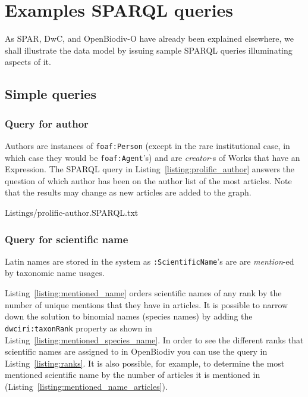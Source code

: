 \section{Examples SPARQL queries}

As SPAR, DwC, and OpenBiodiv-O have already been explained elsewhere, we shall illustrate the data model by issuing sample SPARQL queries illuminating aspects of it.

\subsection{Simple queries}

\subsubsection{Query for author} Authors are instances of {\tt foaf:Person} (except in the rare institutional case, in which case they would be {\tt foaf:Agent}'s) and are \emph{creator}-s of Works that have an Expression. The SPARQL query in Listing~\ref{listing:prolific_author} answers the question of which author has been on the author list of the most articles. Note that the results may change as new articles are added to the graph.


{Listings/prolific-author.SPARQL.txt}

\subsubsection{Query for scientific name}

Latin names are stored in the system as {\tt :ScientificName}'s are are \emph{mention}-ed by taxonomic name usages.

Listing~\ref{listing:mentioned_name} orders scientific names of any rank by the number of unique mentions that they have in articles. It is possible to narrow down the solution to binomial names (species names) by adding the {\tt dwciri:taxonRank} property as shown in Listing~\ref{listing:mentioned_species_name}. In order to see the different ranks that scientific names are assigned to in OpenBiodiv you can use the query in Listing~\ref{listing:ranks}. It is also possible, for example, to determine the most mentioned scientific name by the number of articles it is mentioned in (Listing~\ref{listing:mentioned_name_articles}).

